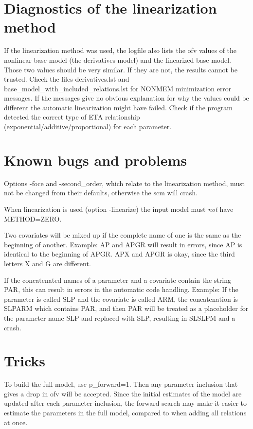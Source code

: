 \section{Diagnostics of the linearization method}
If the linearization method was used, the logfile also lists the ofv values of the nonlinear base model (the derivatives model) and the linearized base model. Those two values should be very similar. If they are not, the results cannot be trusted. Check the files derivatives.lst and base\_model\_with\_included\_relations.lst for NONMEM minimization error messages. If the messages give no obvious explanation for why the values could be different the automatic linearization might have failed. Check if the program detected the correct type of ETA relationship (exponential/additive/proportional) for each parameter. 

\section{Known bugs and problems}
Options -foce and -second\_order, which relate to the linearization method,
must not be changed from their defaults, otherwise the scm will crash.

When linearization is used (option -linearize) the input model must \emph{not} 
have METHOD=ZERO.

Two covariates will be mixed up if the complete name of one is the same as the beginning of another. Example: AP and APGR will result in errors, since AP is identical to the beginning of APGR. APX and APGR is okay, since the third letters X and G are different. 

If the concatenated names of a parameter and a covariate contain the string PAR, this can result in errors in the 
automatic code handling. Example: If the parameter is called SLP and the covariate is called ARM, the concatenation
is SLPARM which contains PAR, and then PAR will be treated as a placeholder for the parameter name SLP and
replaced with SLP, resulting in SLSLPM and a crash.
\section{Tricks}
To build the full model, use p\_forward=1. Then any parameter inclusion that gives a drop in ofv will be accepted. Since the initial estimates of the model are updated after each parameter inclusion, the forward search may make it easier to estimate the parameters in the full model, compared to when adding all relations at once.

